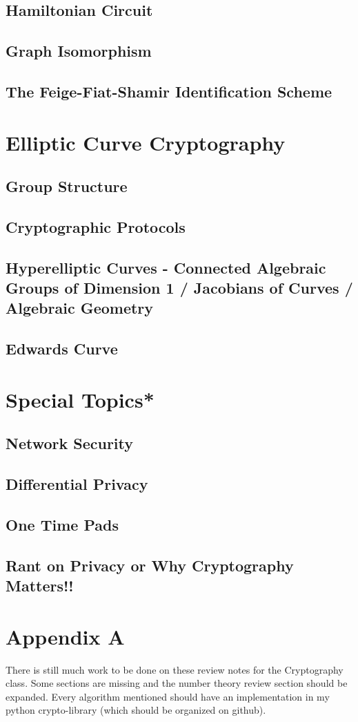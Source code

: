 \documentclass[12pt,a4paper]{article}
\begin{document}
\subsection{Hamiltonian Circuit}
\subsection{Graph Isomorphism}
\subsection{The Feige-Fiat-Shamir Identification Scheme}

\section{Elliptic Curve Cryptography}

\subsection{Group Structure} 
\subsection{Cryptographic Protocols}
\subsection{Hyperelliptic Curves - Connected Algebraic Groups of Dimension 1 / Jacobians of Curves / Algebraic Geometry}
\subsection{Edwards Curve}

\section{Special Topics*}
\subsection{Network Security}
\subsection{Differential Privacy}
\subsection{One Time Pads}
\subsection{Rant on Privacy or Why Cryptography Matters!!}

\section{Appendix A}
There is still much work to be done on these review notes for the Cryptography class. Some sections are missing and the number theory review section should be expanded. Every algorithm mentioned should have an implementation in my python crypto-library (which should be organized on github). 
\end{document}
